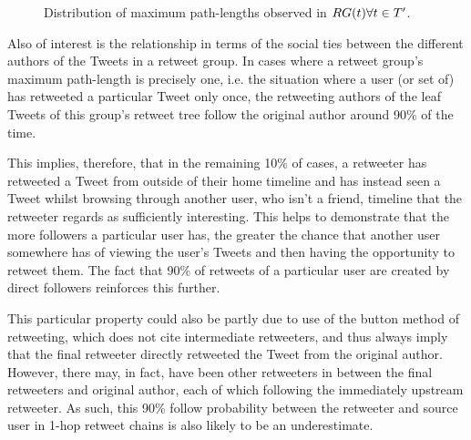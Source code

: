 \begin{figure}[h]
\centering
    \caption{Distribution of maximum path-lengths observed in $RG(t) \forall t \in T'$.}
    \label{fig:pathlength-distribution}
\end{figure}

Also of interest is the relationship in terms of the social ties between the different authors of the Tweets in a retweet group. In cases where a retweet group's maximum path-length is precisely one, i.e. the situation where a user (or set of) has retweeted a particular Tweet only once, the retweeting authors of the leaf Tweets of this group's retweet tree follow the original author around 90\% of the time.

This implies, therefore, that in the remaining 10\% of cases, a retweeter has retweeted a Tweet from outside of their home timeline and has instead seen a Tweet whilst browsing through another user, who isn't a friend, timeline that the retweeter regards as sufficiently interesting. This helps to demonstrate that the more followers a particular user has, the greater the chance that another user somewhere has of viewing the user's Tweets and then having the opportunity to retweet them. The fact that 90\% of retweets of a particular user are created by direct followers reinforces this further.

This particular property could also be partly due to use of the button method of retweeting, which does not cite intermediate retweeters, and thus always imply that the final retweeter directly retweeted the Tweet from the original author. However, there may, in fact, have been other retweeters in between the final retweeters and original author, each of which following the immediately upstream retweeter. As such, this 90\% follow probability between the retweeter and source user in 1-hop retweet chains is also likely to be an underestimate.

